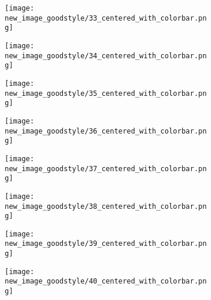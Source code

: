 \documentclass[a4paper,12pt]{article}
\begin{document}
\begin{figure}[H]
  \begin{subfigure}{0.11\textwidth}
    \texttt{[image: new\_image\_goodstyle/33\_centered\_with\_colorbar.png]}
  \end{subfigure}
  \hfill
  \begin{subfigure}{0.11\textwidth}
    \texttt{[image: new\_image\_goodstyle/34\_centered\_with\_colorbar.png]}
  \end{subfigure}
  \hfill
  \begin{subfigure}{0.11\textwidth}
    \texttt{[image: new\_image\_goodstyle/35\_centered\_with\_colorbar.png]}
  \end{subfigure}
  \hfill
  \begin{subfigure}{0.11\textwidth}
    \texttt{[image: new\_image\_goodstyle/36\_centered\_with\_colorbar.png]}
  \end{subfigure}
  \hfill
  \begin{subfigure}{0.11\textwidth}
    \texttt{[image: new\_image\_goodstyle/37\_centered\_with\_colorbar.png]}
  \end{subfigure}
  \hfill
  \begin{subfigure}{0.11\textwidth}
    \texttt{[image: new\_image\_goodstyle/38\_centered\_with\_colorbar.png]}
  \end{subfigure}
  \hfill
  \begin{subfigure}{0.11\textwidth}
    \texttt{[image: new\_image\_goodstyle/39\_centered\_with\_colorbar.png]}
  \end{subfigure}
  \hfill
  \begin{subfigure}{0.11\textwidth}
    \texttt{[image: new\_image\_goodstyle/40\_centered\_with\_colorbar.png]}
  \end{subfigure}
  \hfill
\end{figure}
\end{document}
